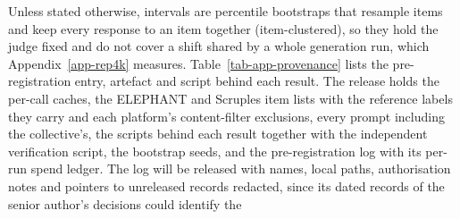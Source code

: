 Unless stated otherwise, intervals are percentile bootstraps that resample items and keep
every response to an item together (item-clustered), so they hold the judge fixed and do not
cover a shift shared by a whole generation run, which Appendix~\ref{app-rep4k} measures.
Table~\ref{tab-app-provenance} lists the pre-registration entry, artefact and script behind each result. The
release holds the per-call caches, the ELEPHANT and Scruples item lists with the reference labels
they carry and each platform's content-filter exclusions, every prompt including the collective's, the scripts
behind each result together with the independent verification script, the bootstrap seeds, and
the pre-registration log with its per-run spend ledger. The log will be released with names,
local paths, authorisation notes and pointers to unreleased
records redacted, since its dated records of the senior author's decisions could identify the
